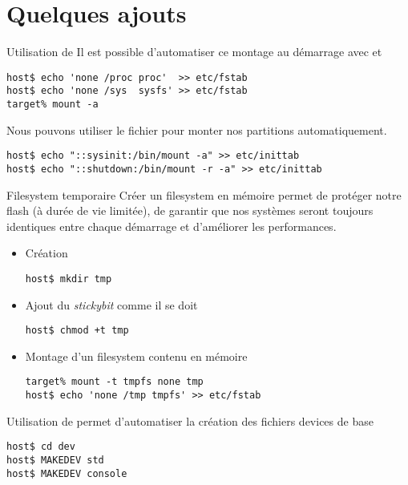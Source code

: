 \section{Quelques ajouts}
 
\begin{frame}[fragile=singleslide]{Utilisation de }
  Il  est   possible  d'automatiser  ce  montage   au  démarrage  avec
   et 
  \begin{lstlisting}
host$ echo 'none /proc proc'  >> etc/fstab
host$ echo 'none /sys  sysfs' >> etc/fstab
target% mount -a
  \end{lstlisting}

  Nous pouvons utiliser le  fichier  pour monter nos
  partitions automatiquement.
  \begin{lstlisting}
host$ echo "::sysinit:/bin/mount -a" >> etc/inittab 
host$ echo "::shutdown:/bin/mount -r -a" >> etc/inittab 
  \end{lstlisting}
\end{frame}

\begin{frame}[fragile=singleslide]{Filesystem temporaire}
  Créer un  filesystem en  mémoire permet de  protéger notre  flash (à
  durée  de vie  limitée), de  garantir que  nos systèmes  seront toujours
  identiques entre chaque démarrage et d'améliorer les performances.
  \begin{itemize}
    \item Création
    \begin{lstlisting}
host$ mkdir tmp
    \end{lstlisting}
  \item Ajout du \emph{stickybit} comme il se doit
    \begin{lstlisting}
host$ chmod +t tmp
    \end{lstlisting}
  \item Montage d'un filesystem contenu en mémoire
    \begin{lstlisting}
target% mount -t tmpfs none tmp
host$ echo 'none /tmp tmpfs' >> etc/fstab
    \end{lstlisting}
  \end{itemize}
\end{frame}

\begin{frame}[fragile=singleslide]{Utilisation de }
   permet d'automatiser  la création des fichiers devices
  de base
  \begin{lstlisting}
host$ cd dev
host$ MAKEDEV std
host$ MAKEDEV console
  \end{lstlisting}
\end{frame}


